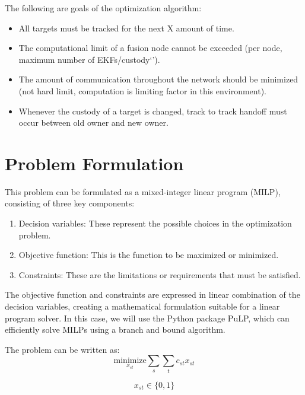\documentclass{article}
\begin{document}
    The following are goals of the optimization algorithm:
    \begin{itemize}
        \item All targets must be tracked for the next X amount of time.
        \item The computational limit of a fusion node cannot be exceeded (per node, maximum number of EKFs/custody`').
        \item The amount of communication throughout the network should be minimized (not hard limit, computation is limiting factor in this environment).
        \item Whenever the custody of a target is changed, track to track handoff must occur between old owner and new owner.
    \end{itemize}

    \newpage

    \section{Problem Formulation}
    This problem can be formulated as a mixed-integer linear program (MILP), consisting of three key components:
    \begin{enumerate}
        \item Decision variables: These represent the possible choices in the optimization problem.
        \item Objective function: This is the function to be maximized or minimized.
        \item Constraints: These are the limitations or requirements that must be satisfied.
    \end{enumerate}


    The objective function and constraints are expressed in linear combination of the decision variables, creating a mathematical formulation suitable for a linear program solver. In this case, we will use the Python package PuLP, which can efficiently solve MILPs using a branch and bound algorithm.
    
    The problem can be written as: \\
    
    \begin{equation}
        \underset{x_{st}}{\text{minimize}} \sum_{s} \sum_{t} c_{st} x_{st}
        \label{eq:objective}
    \end{equation}
    

    \begin{equation}
        x_{st} \in \{0, 1\} 
        \label{eq:binary}
    \end{equation}
\end{document}
